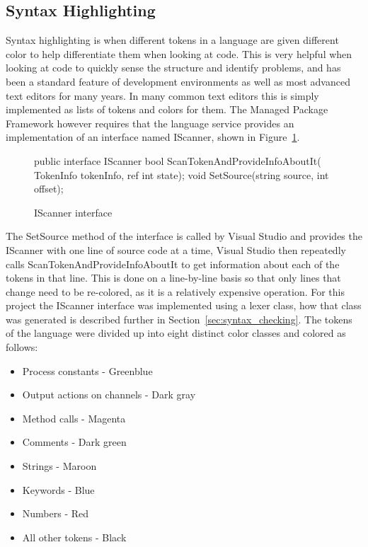 	\subsection{Syntax Highlighting}
	Syntax highlighting is when different tokens in a language are given 
	different color to help differentiate them when looking at code. This
	is very helpful when looking at code to quickly sense the structure and
	identify problems, and has been a standard feature of development 
	environments as well as most advanced text editors for many years. In many
	common text editors this is simply implemented as lists of tokens and 
	colors for them. The Managed Package Framework however requires that the 
	language service provides an implementation of an interface named 
	\textsf{IScanner}, shown in Figure~\ref{fig:iscanner}. 

	\begin{figure}
	\begin{csharp}
  public interface IScanner {
    bool ScanTokenAndProvideInfoAboutIt(
    		TokenInfo tokenInfo, ref int state);
    void SetSource(string source, int offset);
  }	
\end{csharp}
	\caption{IScanner interface}
	\label{fig:iscanner}
\end{figure}

	The \textsf{SetSource} method of the interface is called by Visual Studio 
	and provides the \textsf{IScanner} with one line of source code at a time, 
	Visual Studio then repeatedly calls \textsf{ScanTokenAndProvideInfoAboutIt} 
	to get information about each of the tokens in that line. This is done on a 
	line-by-line basis so that only lines that change need to be re-colored, as 
	it is a relatively expensive operation. For this project the 
	\textsf{IScanner} interface was implemented using a lexer class, how that 
	class was generated is described further in 
	Section~\ref{sec:syntax_checking}. The tokens of the language were divided 
	up into eight distinct color classes and colored as follows:
	
	\begin{itemize}
		\item Process constants - Greenblue
		\item Output actions on channels	- Dark gray
		\item Method calls - Magenta
		\item Comments - Dark green
		\item Strings - Maroon
		\item Keywords - Blue
		\item Numbers - Red
		\item All other tokens - Black
	\end{itemize}

